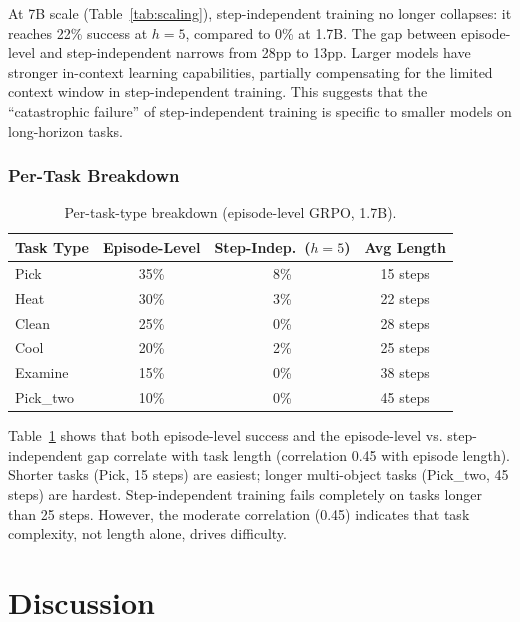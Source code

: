 \documentclass[11pt]{article}
\begin{document}
At 7B scale (Table~\ref{tab:scaling}), step-independent training no longer collapses: it reaches 22\% success at $h{=}5$, compared to 0\% at 1.7B.
The gap between episode-level and step-independent narrows from 28pp to 13pp.
Larger models have stronger in-context learning capabilities, partially compensating for the limited context window in step-independent training.
This suggests that the ``catastrophic failure'' of step-independent training is specific to smaller models on long-horizon tasks.

\subsubsection{Per-Task Breakdown}

\begin{table}[h]
\centering
\caption{Per-task-type breakdown (episode-level GRPO, 1.7B).}
\label{tab:pertask}
\begin{tabular}{lccc}
\toprule
Task Type & Episode-Level & Step-Indep.\ ($h{=}5$) & Avg Length \\
\midrule
Pick       & 35\% & 8\%  & 15 steps \\
Heat       & 30\% & 3\%  & 22 steps \\
Clean      & 25\% & 0\%  & 28 steps \\
Cool       & 20\% & 2\%  & 25 steps \\
Examine    & 15\% & 0\%  & 38 steps \\
Pick\_two  & 10\% & 0\%  & 45 steps \\
\bottomrule
\end{tabular}
\end{table}

Table~\ref{tab:pertask} shows that both episode-level success and the episode-level vs. step-independent gap correlate with task length (correlation 0.45 with episode length).
Shorter tasks (Pick, 15 steps) are easiest; longer multi-object tasks (Pick\_two, 45 steps) are hardest.
Step-independent training fails completely on tasks longer than 25 steps.
However, the moderate correlation (0.45) indicates that task complexity, not length alone, drives difficulty.


\section{Discussion}
\end{document}
